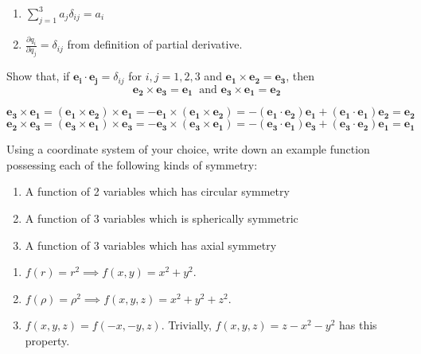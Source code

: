 \documentclass[a4paper]{article}
\begin{document}
\begin{ans}\leavevmode
\begin{enumerate}[label=(\alph*)]
\item  $\sum_{j=1}^3a_j\delta_{ij}=a_i$
\item $\frac{\partial q_i}{\partial q_j}=\delta_{ij}$ from definition of partial derivative.
\end{enumerate}
\end{ans}
\begin{qns} Show that, if $\mathbf{e_i}\cdot\mathbf{e_j}=\delta_{ij}$ for $i,j=1,2,3$ and $\mathbf{e_1}\times\mathbf{e_2}=\mathbf{e_3}$, then
$$\mathbf{e_2}\times\mathbf{e_3}=\mathbf{e_1}~\text{    and    }\mathbf{e_3}\times\mathbf{e_1}=\mathbf{e_2}$$
\end{qns}
\begin{ans}
$$\mathbf{e_3}\times\mathbf{e_1}=(\mathbf{e_1}\times\mathbf{e_2})\times\mathbf{e_1}=-\mathbf{e_1}\times(\mathbf{e_1}\times\mathbf{e_2})=-(\mathbf{e_1}\cdot\mathbf{e_2})\mathbf{e_1}+(\mathbf{e_1}\cdot\mathbf{e_1})\mathbf{e_2}=\mathbf{e_2}$$
$$\mathbf{e_2}\times\mathbf{e_3}=(\mathbf{e_3}\times\mathbf{e_1})\times\mathbf{e_3}=-\mathbf{e_3}\times(\mathbf{e_3}\times\mathbf{e_1})=-(\mathbf{e_3}\cdot\mathbf{e_1})\mathbf{e_3}+(\mathbf{e_3}\cdot\mathbf{e_2})\mathbf{e_1}=\mathbf{e_1}$$
\end{ans}
\begin{qns} Using a coordinate system of your choice, write down an example function possessing each of the following kinds of symmetry:
\begin{enumerate}[label=(\alph*)]
    \item A function of 2 variables which has circular symmetry
    \item A function of 3 variables which is spherically symmetric
    \item A function of 3 variables which has axial symmetry
\end{enumerate}
\end{qns}
\begin{ans}\leavevmode
\begin{enumerate}[label=(\alph*)]
\item  $f(r)=r^2\implies f(x,y)=x^2+y^2$. 
\item  $f(\rho)=\rho^2\implies f(x,y,z)=x^2+y^2+z^2$.
\item $f(x,y,z)=f(-x,-y,z)$. Trivially, $f(x,y,z)=z-x^2-y^2$ has this property.
\end{enumerate}
\end{ans}
\end{document}
